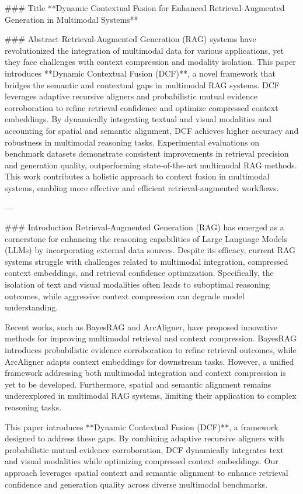 ### Title
**Dynamic Contextual Fusion for Enhanced Retrieval-Augmented Generation in Multimodal Systems**

### Abstract
Retrieval-Augmented Generation (RAG) systems have revolutionized the integration of multimodal data for various applications, yet they face challenges with context compression and modality isolation. This paper introduces **Dynamic Contextual Fusion (DCF)**, a novel framework that bridges the semantic and contextual gaps in multimodal RAG systems. DCF leverages adaptive recursive aligners and probabilistic mutual evidence corroboration to refine retrieval confidence and optimize compressed context embeddings. By dynamically integrating textual and visual modalities and accounting for spatial and semantic alignment, DCF achieves higher accuracy and robustness in multimodal reasoning tasks. Experimental evaluations on benchmark datasets demonstrate consistent improvements in retrieval precision and generation quality, outperforming state-of-the-art multimodal RAG methods. This work contributes a holistic approach to context fusion in multimodal systems, enabling more effective and efficient retrieval-augmented workflows.

---

### Introduction
Retrieval-Augmented Generation (RAG) has emerged as a cornerstone for enhancing the reasoning capabilities of Large Language Models (LLMs) by incorporating external data sources. Despite its efficacy, current RAG systems struggle with challenges related to multimodal integration, compressed context embeddings, and retrieval confidence optimization. Specifically, the isolation of text and visual modalities often leads to suboptimal reasoning outcomes, while aggressive context compression can degrade model understanding.

Recent works, such as BayesRAG and ArcAligner, have proposed innovative methods for improving multimodal retrieval and context compression. BayesRAG introduces probabilistic evidence corroboration to refine retrieval outcomes, while ArcAligner adapts context embeddings for downstream tasks. However, a unified framework addressing both multimodal integration and context compression is yet to be developed. Furthermore, spatial and semantic alignment remains underexplored in multimodal RAG systems, limiting their application to complex reasoning tasks.

This paper introduces **Dynamic Contextual Fusion (DCF)**, a framework designed to address these gaps. By combining adaptive recursive aligners with probabilistic mutual evidence corroboration, DCF dynamically integrates text and visual modalities while optimizing compressed context embeddings. Our approach leverages spatial context and semantic alignment to enhance retrieval confidence and generation quality across diverse multimodal benchmarks.

